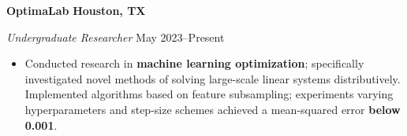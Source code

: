 \textbf{OptimaLab} \hfill \textbf{Houston, TX}\par
\textit{Undergraduate Researcher} \hfill May 2023--Present

\begin{itemize}
	\item Conducted research in \textbf{machine learning optimization}; specifically investigated novel methods of solving large-scale linear systems distributively. Implemented algorithms based on feature subsampling; experiments varying hyperparameters and step-size schemes achieved a mean-squared error \textbf{below 0.001}.
\end{itemize}\par

